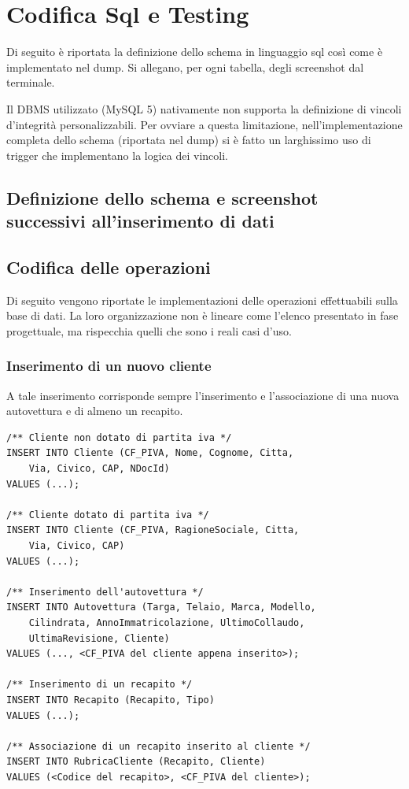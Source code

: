 \section{Codifica Sql e Testing} %
\label{sec:codifica_sql_e_testing}

Di seguito è riportata la definizione dello schema in linguaggio sql così come è implementato nel dump. Si allegano, per ogni tabella, degli screenshot dal terminale.

Il DBMS utilizzato (MySQL 5) nativamente non supporta la definizione di vincoli d'integrità personalizzabili. Per ovviare a questa limitazione, nell'implementazione completa dello schema (riportata nel dump) si è fatto un larghissimo uso di trigger che implementano la logica dei vincoli.

	\subsection{Definizione dello schema e screenshot successivi all'inserimento di dati}

		\pagebreak
	\subsection{Codifica delle operazioni}
		Di seguito vengono riportate le implementazioni delle operazioni effettuabili sulla base di dati. La loro organizzazione non è lineare come l'elenco presentato in fase progettuale, ma rispecchia quelli che sono i reali casi d'uso.

		\subsubsection{Inserimento di un nuovo cliente}
			A tale inserimento corrisponde sempre l'inserimento e l'associazione di una nuova autovettura e di almeno un recapito.
				\begin{lstlisting}
/** Cliente non dotato di partita iva */
INSERT INTO Cliente (CF_PIVA, Nome, Cognome, Citta, 
	Via, Civico, CAP, NDocId) 
VALUES (...);

/** Cliente dotato di partita iva */
INSERT INTO Cliente (CF_PIVA, RagioneSociale, Citta, 
	Via, Civico, CAP) 
VALUES (...);

/** Inserimento dell'autovettura */
INSERT INTO Autovettura (Targa, Telaio, Marca, Modello, 
	Cilindrata, AnnoImmatricolazione, UltimoCollaudo, 
	UltimaRevisione, Cliente) 
VALUES (..., <CF_PIVA del cliente appena inserito>);

/** Inserimento di un recapito */
INSERT INTO Recapito (Recapito, Tipo)
VALUES (...);

/** Associazione di un recapito inserito al cliente */
INSERT INTO RubricaCliente (Recapito, Cliente)
VALUES (<Codice del recapito>, <CF_PIVA del cliente>);
				\end{lstlisting}

